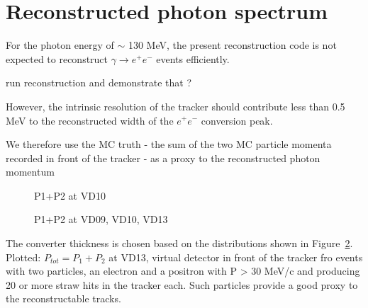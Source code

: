 \section{Reconstructed photon spectrum}

For the photon energy of $\sim$ 130 MeV, the present reconstruction code is not expected
to reconstruct $\gamma \to e^+e^-$ events efficiently.

{\red run reconstruction and demonstrate that ? }

However, the intrinsic resolution of the tracker should contribute less than 0.5 MeV to the
reconstructed width of the $e^+e^-$ conversion peak.

We therefore use the MC truth - the sum of the two MC particle momenta recorded in front
of the tracker - as a proxy to the reconstructed photon momentum
\begin{figure}[H]
  \caption{
    \label{figure:sum_mom_vd10}
    P1+P2 at VD10
  }
\end{figure}

\begin{figure}[H]
  \caption{
    \label{figure:sum_mom_vd13}
    P1+P2 at VD09, VD10, VD13
  }
\end{figure}

The converter thickness is chosen based on the distributions shown in Figure~\ref{figure:sum_mom_vd13}.
Plotted: $P_{tot} = P_1 + P_2$ at VD13, virtual detector in front of the tracker fro events with
two particles, an electron and a positron with P > 30 MeV/c and producing 20 or more straw hits in the tracker each.
Such particles provide a good proxy to the reconstructable tracks.

